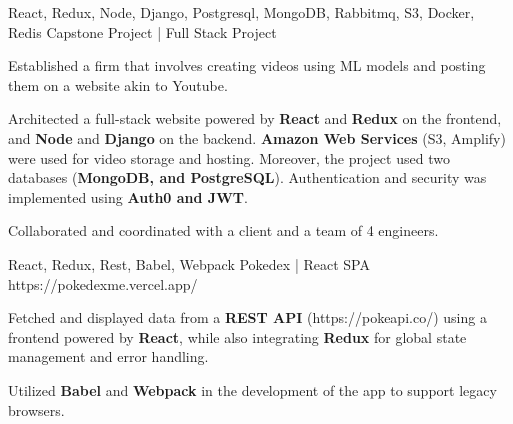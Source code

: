 


\begin{cventries}



\cventry
{React, Redux, Node, Django, Postgresql, MongoDB, Rabbitmq, S3, Docker, Redis } %
{Capstone Project | Full Stack Project}  %
{} %
{}
{
	\begin{cvitems} %
		\item {Established a firm that involves creating videos using ML models and posting them on a website akin to Youtube.}
		\item {Architected a full-stack website powered by \textbf{React} and \textbf{Redux} on the frontend, and \textbf{Node} and \textbf{Django} on the backend. \textbf{Amazon Web Services} (S3, Amplify) were used for video storage and hosting. Moreover, the project used two databases (\textbf{MongoDB, and PostgreSQL}). Authentication and security was implemented using \textbf{Auth0 and JWT}.}
		\item {Collaborated and coordinated with a client and a team of 4 engineers.}
	\end{cvitems}
}

\cventry
{React, Redux, Rest, Babel, Webpack} %
{Pokedex | React SPA}  %
{https://pokedexme.vercel.app/} %
{}
{
	\begin{cvitems} %
		\item {Fetched and displayed data from a \textbf{REST API} (https://pokeapi.co/) using a frontend powered by \textbf{React}, while also integrating \textbf{Redux}  for global state management and error handling.}
		\item {Utilized \textbf{Babel} and \textbf{Webpack}  in the development of the app to support legacy browsers.}
	\end{cvitems}
}


\end{cventries}
